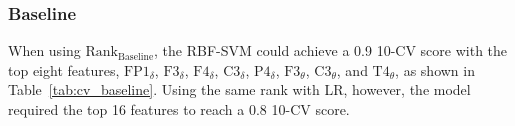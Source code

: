 \documentclass[pdflatex,sn-mathphys]{sn-jnl}%
\theoremstyle{thmstyleone}%
\theoremstyle{thmstyletwo}%
\theoremstyle{thmstylethree}%
\begin{document}

\subsubsection{Baseline}

When using $\text{Rank}_{\text{Baseline}}$, the RBF-SVM could achieve a 0.9 10-CV score with the top eight features, $\text{FP1}_{\delta}$, $\text{F3}_{\delta}$, $\text{F4}_{\delta}$, $\text{C3}_{\delta}$, $\text{P4}_{\delta}$, $\text{F3}_{\theta}$, $\text{C3}_{\theta}$, and $\text{T4}_{\theta}$, as shown in Table~\ref{tab:cv_baseline}. Using the same rank with LR, however, the model required the top 16 features to reach a 0.8 10-CV score. 
\end{document}
